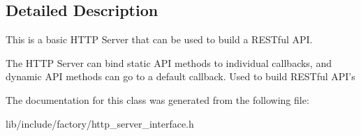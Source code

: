 \subsection{Detailed Description}
This is a basic H\-T\-T\-P Server that can be used to build a R\-E\-S\-Tful A\-P\-I. 

The H\-T\-T\-P Server can bind static A\-P\-I methods to individual callbacks, and dynamic A\-P\-I methods can go to a default callback. Used to build R\-E\-S\-Tful A\-P\-I's 

The documentation for this class was generated from the following file\-:\begin{DoxyCompactItemize}
\item 
lib/include/factory/http\-\_\-server\-\_\-interface.\-h\end{DoxyCompactItemize}
